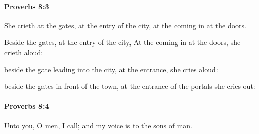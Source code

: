 		\paragraph{Proverbs 8:3} %
			\label{PROVERBS-8-3}

			She crieth at the gates, at the entry of the city, at the coming in at the doors.

			\begin{versebox}
					\item[BHS] 
					\item[ASV] Beside the gates, at the entry of the city, At the coming in at the doors, she crieth aloud:
					\item[NIV] beside the gate leading into the city, at the entrance, she cries aloud:
					\item[NRSV] beside the gates in front of the town, at the entrance of the portals she cries out:
			\end{versebox}

		\paragraph{Proverbs 8:4} %
			\label{PROVERBS-8-4}

			Unto you, O men, I call; and my voice is to the sons of man.

